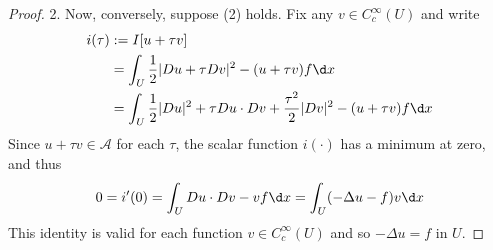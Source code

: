 \begin{theorem}
\begin{proof}
        2. Now, conversely, suppose (2) holds. Fix any $v \in C_c^{\infty}(U)$ and write
        \begin{equation*}
            \begin{aligned}
                i(\tau) & :=I[u+\tau v]                                                                           \\
                        & =\int_U \frac{1}{2}|D u+\tau D v|^2-(u+\tau v) f \d x                                   \\
                        & =\int_U \frac{1}{2}|D u|^2+\tau D u \cdot D v+\frac{\tau^2}{2}|D v|^2-(u+\tau v) f \d x
            \end{aligned}
        \end{equation*}
        Since $u+\tau v \in \mathcal{A}$ for each $\tau$, the scalar function $i(\cdot)$ has a minimum at zero, and thus
        \begin{equation*}
            0
            =
            i^{\prime}(0)
            =\int_U D u \cdot D v-v f \d x=\int_U(-\Delta u-f) v \d x
        \end{equation*}
        This identity is valid for each function $v \in C_c^{\infty}(U)$ and so $-\Delta u=f$ in $U$.
    \end{proof}
\end{theorem}